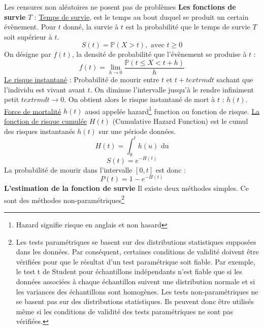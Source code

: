 Les censures non aléatoires ne posent pas de problèmes
\textbf{Les fonctions de survie }\newline
$T$ : \underline{Temps de survie}, est le temps au bout duquel se produit un certain évènement. Pour $t$ donné, la survie à $t$ est la probabilité que le temps de survie $T$ soit supérieur à $t$.
$$S(t) = \mathbb{P}(X > t), \textrm{ avec } t \geq 0$$
On désigne par $f(t)$, la densité de probabilité que l'évènement se produise à $t$ : 
$$f(t) = \lim\limits_{h \rightarrow 0} \frac{\mathbb{P}(t\leq X < t+h)}{h}$$
\underline{Le risque instantané} : Probabilité de mourir entre $t$ et $t+textrm{dt}$ sachant que l'individu est vivant avant $t$. On diminue l'intervalle jusqu'à le rendre infiniment petit $textrm{dt} \rightarrow 0$. On obtient alors le risque instantané de mort à $t$ : $h(t)$.\newline
\underline{Force de mortalité} $h(t)$ aussi appelée hazard\footnote{Hazard signifie risque en anglais et non hasard} function ou fonction de risque.
\underline{La fonction de risque cumulée} $H(t)$ (Cumulative Hazard Function) est le cumul des risques instantanés $h(t)$ sur une période données. 
$$H(t) = \int_{0}^{t} h(u)\textrm{ du}$$
$$S(t) = e^{-H(t)}$$
La probabilité de mourir dans l'intervalle $[0,t]$ est donc : 
$$P(t) = 1 - e^{-H(t)}$$
\textbf{L'estimation de la fonction de survie }
Il existe deux méthodes simples. Ce sont des méthodes non-paramétriques\footnote{Les tests paramétriques se basent sur des distributions statistiques supposées dans les données. Par conséquent, certaines conditions de validité doivent être vérifiées pour que le résultat d'un test paramétrique soit fiable. Par exemple, le test t de Student pour échantillons indépendants n'est fiable que si les données associées à chaque échantillon suivent une distribution normale et si les variances des échantillons sont homogènes.\newline
Les tests non-paramétriques ne se basent pas sur des distributions statistiques. Ils peuvent donc être utilisés même si les conditions de validité des tests paramétriques ne sont pas vérifiées.}
